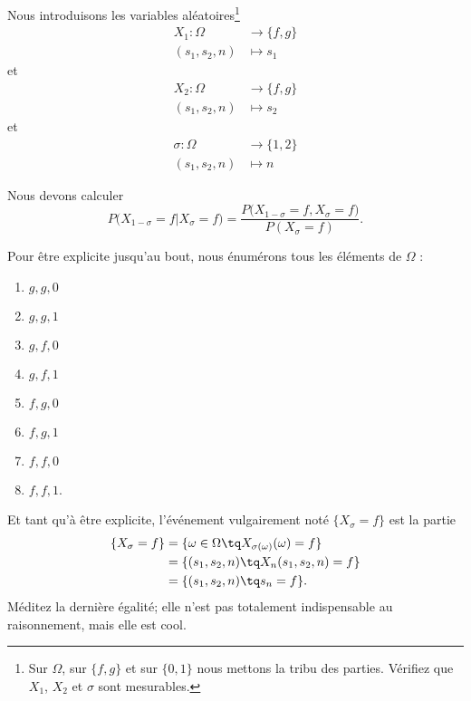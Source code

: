 Nous introduisons les variables aléatoires\footnote{Sur \( \Omega\), sur \( \{ f,g \}\) et sur \( \{ 0,1 \}\) nous mettons la tribu des parties. Vérifiez que \( X_1\), \( X_2\) et \( \sigma\) sont mesurables.}
\begin{equation}
	\begin{aligned}
		X_1\colon \Omega & \to \{ f,g \} \\
		(s_1,s_2,n)      & \mapsto s_1
	\end{aligned}
\end{equation}
et
\begin{equation}
	\begin{aligned}
		X_2\colon \Omega & \to \{ f,g \} \\
		(s_1,s_2,n)      & \mapsto s_2
	\end{aligned}
\end{equation}
et
\begin{equation}
	\begin{aligned}
		\sigma\colon \Omega & \to \{ 1,2 \} \\
		(s_1,s_2,n)         & \mapsto n
	\end{aligned}
\end{equation}


Nous devons calculer
\begin{equation}
	P\big( X_{1-\sigma}=f|X_{\sigma}=f \big)=\frac{ P\big( X_{1-\sigma}=f,X_{\sigma}=f \big) }{ P(X_{\sigma}=f) }.
\end{equation}

Pour être explicite jusqu'au bout, nous énumérons tous les éléments de \( \Omega\) :
\begin{multicols}{4}
	\begin{enumerate}
		\item
		      \( g,g,0\)
		\item
		      \( g,g,1\)
		\item
		      \( g,f,0\)
		\item
		      \( g,f,1\)
		\item
		      \( f,g,0\)
		\item
		      \( f,g,1\)
		\item
		      \( f,f,0\)
		\item
		      \( f,f,1\).
	\end{enumerate}
\end{multicols}

Et tant qu'à être explicite, l'événement vulgairement noté \( \{ X_{\sigma}=f \}\) est la partie
\begin{subequations}
	\begin{align}
		\{ X_{\sigma}=f \} & =\{ \omega\in \Omega\tq X_{\sigma(\omega)}(\omega)=f \} \\
		                   & =\{ (s_1,s_2,n)\tq X_n(s_1,s_2,n)=f \}                  \\
		                   & =\{ (s_1,s_2,n)\tq s_n=f \}.
	\end{align}
\end{subequations}
Méditez la dernière égalité; elle n'est pas totalement indispensable au raisonnement, mais elle est cool.


